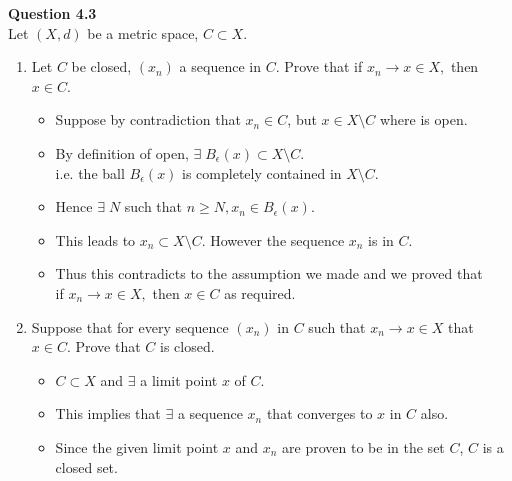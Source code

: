\documentclass[12pt]{article}
\begin{document}
\newpage
\textbf{Question 4.3}\\
Let $(X,d)$ be a metric space, $C\subset X$.
\begin{enumerate}[label=(\roman*)]
    \item Let $C$ be closed, $(x_n)$ a sequence in $C$. Prove that if $x_n \rightarrow x \in X,$ then $x\in C$.
    \begin{itemize}
        \item Suppose by contradiction that $x_n \in C$, but $x\in X \setminus C$ where is open.
        
        \item By definition of open, $\exists\; B_\epsilon(x) \subset X\setminus C$. 
        \\i.e. the ball $B_\epsilon(x)$ is completely contained in $X\setminus C$.
        
        \item Hence $\exists\; N$ such that $n\ge N, x_n\in B_\epsilon(x)$.
        
        \item This leads to $x_n \subset X\setminus C$. However the sequence $x_n$ is in $C$.

        \item Thus this contradicts to the assumption we made and we proved that \\
        if $x_n \rightarrow x \in X,$ then $x\in C$ as required.
    \end{itemize}
    
    \item Suppose that for every sequence $(x_n)$ in $C$ such that $x_n \rightarrow x \in X$ that $x \in C$. Prove that $C$ is closed.
    \begin{itemize}
        \item $C\subset X$ and $\exists$ a limit point $x$ of $C$.
        \item This implies that $\exists$ a sequence $x_n$ that converges to $x$ in $C$ also.
        \item Since the given limit point $x$ and $x_n$ are proven to be in the set $C$, $C$ is a closed set.
    \end{itemize}
    
\end{enumerate}
\end{document}
